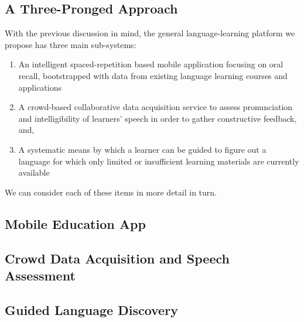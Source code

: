 \subsection{A Three-Pronged Approach} 
With the previous discussion in mind, the general language-learning platform we propose has three main sub-systems:
\begin{enumerate}
\item An intelligent spaced-repetition based mobile application focusing on oral recall, bootstrapped with data from existing language learning courses and applications
\item A crowd-based collaborative data acquisition service to assess pronunciation and intelligibility of learners' speech in order to gather constructive feedback, and,
\item A systematic means by which a learner can be guided to figure out a language for which only limited or insufficient learning materials are currently available
\end{enumerate}

We can consider each of these items in more detail in turn.

\subsection{Mobile Education App}
\subsection{Crowd Data Acquisition and Speech Assessment}
\subsection{Guided Language Discovery}


